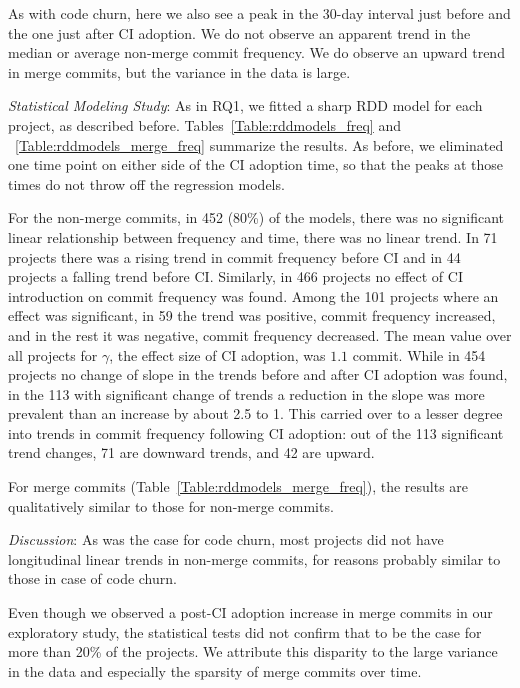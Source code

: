As with code churn, here we also see a peak in the 30-day 
interval just before and the one just after CI adoption.
We do not observe an apparent trend in the 
median or average non-merge commit frequency.
We do observe an upward trend in merge commits, but the variance in the data is large.

\smallskip\noindent \emph{Statistical Modeling Study}: 
As in RQ1, we fitted a sharp RDD model for each project, as described before.
Tables~\ref{Table:rddmodels_freq} and ~\ref{Table:rddmodels_merge_freq} summarize the results.
As before, we eliminated one time point on either side of the CI adoption 
time, so that the peaks at those times  do not throw off the regression models.


For the non-merge commits, in 452 (80\%) of the models, there was no significant linear relationship 
between  frequency and time, \ie there was no linear trend.
In 71 projects there was a rising trend in commit frequency before CI 
and in 44 projects a falling trend before CI.
Similarly, in 466 projects no effect of CI introduction on commit frequency 
was found. 
Among the 101 projects where an effect was significant, in 59 the trend 
was positive, \ie commit frequency increased, and in the rest it was 
negative, \ie commit frequency decreased.
The mean value over all projects for $\gamma$, the effect size of CI 
adoption, was $1.1$ commit.
While in 454 projects no change of slope in the trends before and after CI 
adoption was found, in the 113 with significant change of trends a reduction 
in the slope was more prevalent than an increase by about 2.5 to 1.
This carried over to a lesser degree into trends in commit frequency 
following CI adoption: out of the 113 significant trend changes, 71 are 
downward trends, and 42 are upward.

For merge commits (Table~\ref{Table:rddmodels_merge_freq}), the results 
are qualitatively similar to those for non-merge commits.

\smallskip\noindent \emph{Discussion}:
As was the case for code churn, most projects did not have longitudinal 
linear trends in non-merge commits, for reasons probably similar to those 
in case of code churn.

Even though  we observed a post-CI adoption increase in merge commits 
in our exploratory study, the statistical tests did not confirm that to be the 
case for more than 20\% of the projects. 
We attribute this disparity to the large variance in the data and especially 
the sparsity of merge commits over time. 


